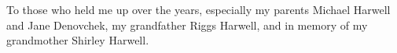 To those who held me up over the years, especially my parents Michael Harwell
and Jane Denovchek, my grandfather Riggs Harwell, and in memory of my
grandmother Shirley Harwell.
